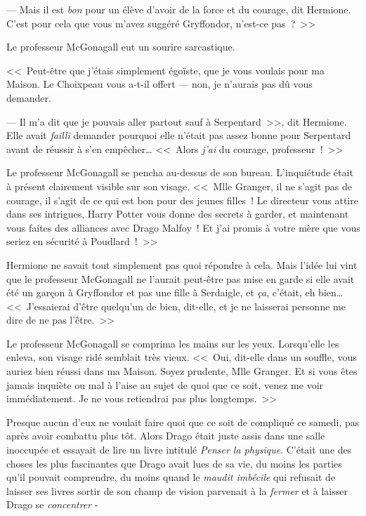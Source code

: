 --- Mais il est \emph{bon} pour un élève d'avoir de la force et du courage, dit Hermione. C'est pour cela que vous m'avez suggéré Gryffondor, n'est-ce pas~?~>>

Le professeur McGonagall eut un sourire sarcastique.

<<~Peut-être que j'étais simplement égoïste, que je vous voulais pour ma Maison. Le Choixpeau vous a-t-il offert — non, je n'aurais pas dû vous demander.

--- Il m'a dit que je pouvais aller partout sauf à Serpentard~>>, dit Hermione. Elle avait \emph{failli} demander pourquoi elle n'était pas assez bonne pour Serpentard avant de réussir à s'en empêcher… <<~Alors \emph{j'ai} du courage, professeur~!~>>

Le professeur McGonagall se pencha au-dessus de son bureau. L'inquiétude était à présent clairement visible sur son visage. <<~Mlle Granger, il ne s'agit pas de courage, il s'agit de ce qui est bon pour des jeunes filles~! Le directeur vous attire dans ses intrigues, Harry Potter vous donne des secrets à garder, et maintenant vous faites des alliances avec Drago Malfoy~! Et j'ai promis à votre mère que vous seriez en sécurité à Poudlard~!~>>

Hermione ne savait tout simplement pas quoi répondre à cela. Mais l'idée lui vint que le professeur McGonagall ne l'aurait peut-être pas mise en garde si elle avait été un garçon à Gryffondor et pas une fille à Serdaigle, et \emph{ça}, c'était, eh bien… <<~J'essaierai d'être quelqu'un de bien, dit-elle, et je ne laisserai personne me dire de ne pas l'être.~>>

Le professeur McGonagall se comprima les mains sur les yeux. Lorsqu'elle les enleva, son visage ridé semblait très vieux. <<~Oui, dit-elle dans un souffle, vous auriez bien réussi dans ma Maison. Soyez prudente, Mlle Granger. Et si vous êtes jamais inquiète ou mal à l'aise au sujet de quoi que ce soit, venez me voir immédiatement. Je ne vous retiendrai pas plus longtemps.~>>


Presque aucun d'eux ne voulait faire quoi que ce soit de compliqué ce samedi, pas après avoir combattu plus tôt. Alors Drago était juste assis dans une salle inoccupée et essayait de lire un livre intitulé \emph{Penser la physique}. C'était une des choses les plus fascinantes que Drago avait lues de sa vie, du moins les parties qu'il pouvait comprendre, du moins quand le \emph{maudit imbécile} qui refusait de laisser ses livres sortir de son champ de vision parvenait à la \emph{fermer} et à laisser Drago se \emph{concentrer} -

